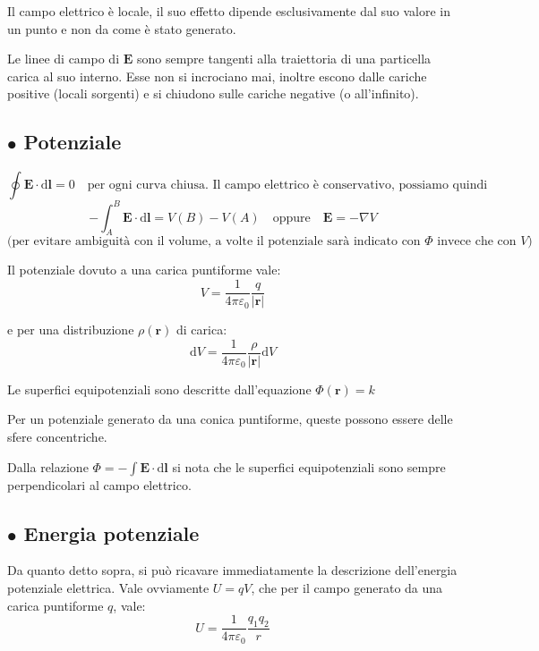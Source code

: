 \documentclass{article}
\begin{document}
Il campo elettrico è locale, il suo effetto dipende esclusivamente dal suo valore in un punto e non da come è stato generato.

Le linee di campo di \( \mathbf{E} \) sono sempre tangenti alla traiettoria di una particella carica al suo interno. Esse non si incrociano mai, inoltre escono dalle cariche positive (locali sorgenti) e si chiudono sulle cariche negative (o all'infinito).







\subsection*{$\bullet$ Potenziale}

\[
\oint \mathbf{E} \cdot \mathrm{d}\mathbf{l} = 0 \quad \text{per ogni curva chiusa. Il campo elettrico è conservativo, possiamo quindi costruire un potenziale (scalare) t.c.:}
\]
\[
-\int_{A}^{B} \mathbf{E} \cdot \mathrm{d}\mathbf{l} = V(B) - V(A) \quad \text{oppure} \quad \mathbf{E} = -\nabla V
\]
\[
\text{(per evitare ambiguità con il volume, a volte il potenziale sarà indicato con } \Phi \text{ invece che con } V)
\]

Il potenziale dovuto a una carica puntiforme vale:
\[
V = \frac{1}{4\pi\varepsilon_0} \frac{q}{|\mathbf{r}|}
\]

e per una distribuzione \( \rho(\mathbf{r}) \) di carica:
\[
\mathrm{d}V = \frac{1}{4\pi\varepsilon_0} \frac{\rho}{|\mathbf{r}|} \mathrm{d}V
\]

Le superfici equipotenziali sono descritte dall'equazione \( \Phi(\mathbf{r}) = k \)

Per un potenziale generato da una conica puntiforme, queste possono essere delle sfere concentriche.

Dalla relazione \( \Phi = -\int \mathbf{E} \cdot \mathrm{d}\mathbf{l} \) si nota che le superfici equipotenziali sono sempre perpendicolari al campo elettrico.









\subsection*{$\bullet$ Energia potenziale}

Da quanto detto sopra, si può ricavare immediatamente la descrizione dell'energia potenziale elettrica. Vale ovviamente \( U = qV \), che per il campo generato da una carica puntiforme \( q \), vale:
\[
U = \frac{1}{4\pi\varepsilon_0} \frac{q_1q_2}{r}
\]
\end{document}
